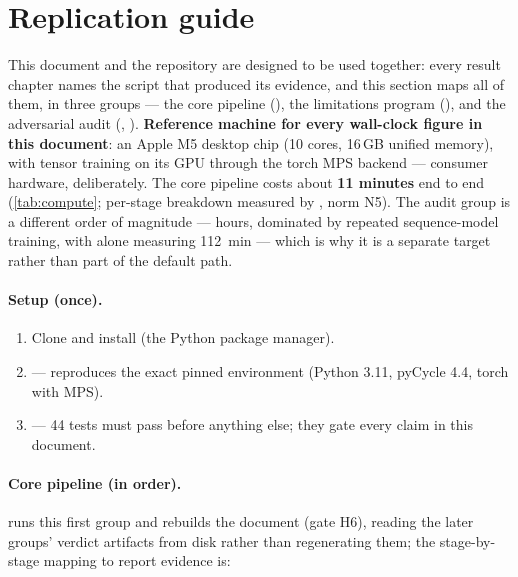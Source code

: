 \section{Replication guide}
\label{sec:replication}

This document and the repository are designed to be used together: every result chapter
names the script that produced its evidence, and this section maps all of them, in three
groups --- the core pipeline (), the limitations program (),
and the adversarial audit (, ).
\textbf{Reference machine for every wall-clock figure in this document}: an Apple M5
desktop chip (10 cores, 16\,GB unified memory), with tensor training on its GPU through the
torch MPS backend --- consumer hardware, deliberately. The core pipeline costs about
\textbf{11 minutes} end to end (\cref{tab:compute}; per-stage breakdown measured by
, norm N5). The audit group is a different order of
magnitude --- hours, dominated by repeated sequence-model training, with  alone
measuring \SI{112}{\minute} --- which is why it is a separate target rather than part of
the default path.

\paragraph{Setup (once).}
\begin{enumerate}
  \item Clone  and install
     (the Python package manager).
  \item {} --- reproduces the exact pinned environment (Python 3.11,
    pyCycle 4.4, torch with MPS).
  \item {} --- 44 tests must pass before anything else; they gate every
    claim in this document.
\end{enumerate}

\paragraph{Core pipeline (in order).}  runs this first group and rebuilds
the document (gate H6), reading the later groups' verdict artifacts from disk rather than
regenerating them; the stage-by-stage mapping to report evidence is:

